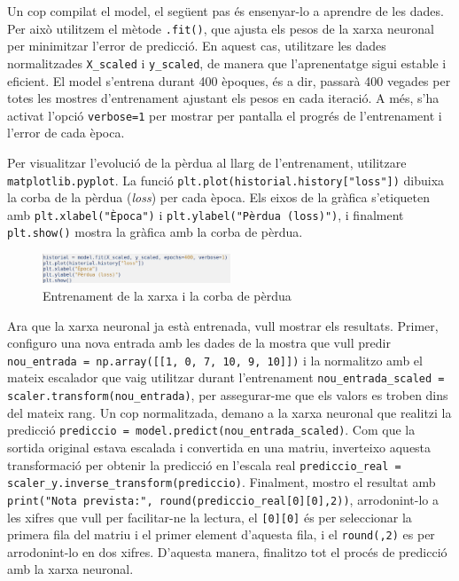 Un cop compilat el model, el següent pas és ensenyar-lo a aprendre de les dades. Per això utilitzem el mètode \texttt{.fit()}, que ajusta els pesos de la xarxa neuronal per minimitzar l’error de predicció. En aquest cas, utilitzare les dades normalitzades \texttt{X\_scaled} i \texttt{y\_scaled}, de manera que l’aprenentatge sigui estable i eficient. El model s’entrena durant 400 èpoques, és a dir, passarà 400 vegades per totes les mostres d’entrenament ajustant els pesos en cada iteració. A més, s’ha activat l’opció \texttt{verbose=1} per mostrar per pantalla el progrés de l’entrenament i l’error de cada època.

Per visualitzar l’evolució de la pèrdua al llarg de l’entrenament, utilitzare \texttt{matplotlib.pyplot}. La funció \texttt{plt.plot(historial.history["loss"])} dibuixa la corba de la pèrdua (\textit{loss}) per cada època. Els eixos de la gràfica s’etiqueten amb \texttt{plt.xlabel("Època")} i \texttt{plt.ylabel("Pèrdua (loss)")}, i finalment \texttt{plt.show()} mostra la gràfica amb la corba de pèrdua.

\begin{figure}[H]
    \centering
    \includegraphics[width=0.5\textwidth]{./figures/28.png}
    \caption{Entrenament de la xarxa i la corba de pèrdua}
\end{figure}

Ara que la xarxa neuronal ja està entrenada, vull mostrar els resultats. Primer, configuro una nova entrada amb les dades de la mostra que vull predir \texttt{nou\_entrada = np.array([[1, 0,   7,  10,  9,  10]])} i la normalitzo amb el mateix escalador que vaig utilitzar durant l’entrenament \texttt{nou\_entrada\_scaled = scaler.transform(nou\_entrada)}, per assegurar-me que els valors es troben dins del mateix rang. Un cop normalitzada, demano a la xarxa neuronal que realitzi la predicció \texttt{prediccio = model.predict(nou\_entrada\_scaled)}. Com que la sortida original estava escalada i convertida en una matriu, inverteixo aquesta transformació per obtenir la predicció en l’escala real \texttt{prediccio\_real = scaler\_y.inverse\_transform(prediccio)}. Finalment, mostro el resultat amb \texttt{print("Nota prevista:", round(prediccio\_real[0][0],2))}, arrodonint-lo a les xifres que vull per facilitar-ne la lectura, el \texttt{[0][0]} és per seleccionar la primera fila del matriu i el primer element d'aquesta fila, i el \texttt{round(,2)} es per arrodonint-lo en dos xifres. D’aquesta manera, finalitzo tot el procés de predicció amb la xarxa neuronal.


